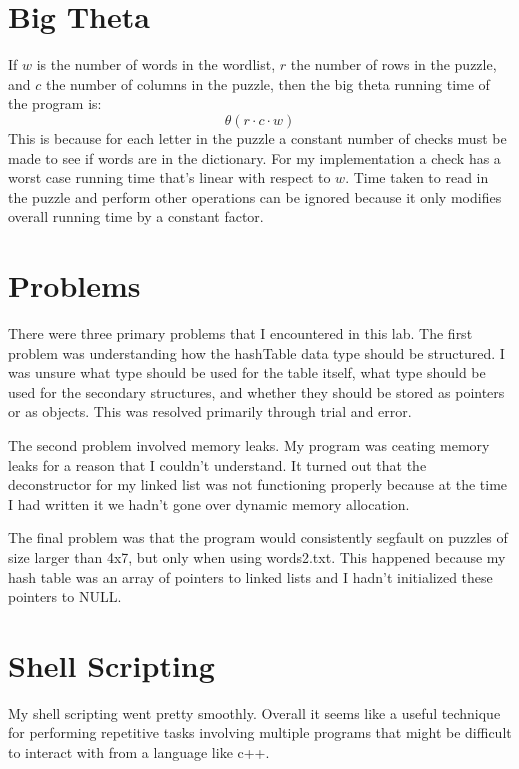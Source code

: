 \documentclass{article} %
\begin{document}
\section{Big Theta}
If $w$ is the number of words in the wordlist, $r$ the number of rows in the puzzle, and $c$ the number of columns in the puzzle, then the big theta running time of the program is:
$$\theta{(r \cdot c \cdot w)}$$
This is because for each letter in the puzzle a constant number of checks must be made to see if words are in the dictionary. For my implementation a check has a worst case running time that's linear with respect to $w$. Time taken to read in the puzzle and perform other operations can be ignored because it only modifies overall running time by a constant factor.

\section{Problems}
There were three primary problems that I encountered in this lab. The first problem was understanding how the hashTable data type should be structured. I was unsure what type should be used for the table itself, what type should be used for the secondary structures, and whether they should be stored as pointers or as objects. This was resolved primarily through trial and error.

The second problem involved memory leaks. My program was ceating memory leaks for a reason that I couldn't understand. It turned out that the deconstructor for my linked list was not functioning properly because at the time I had written it we hadn't gone over dynamic memory allocation.

The final problem was that the program would consistently segfault on puzzles of size larger than 4x7, but only when using words2.txt. This happened because my hash table was an array of pointers to linked lists and I hadn't initialized these pointers to NULL.

\section{Shell Scripting}
My shell scripting went pretty smoothly. Overall it seems like a useful technique for performing repetitive tasks involving multiple programs that might be difficult to interact with from a language like c++.
\end{document}
